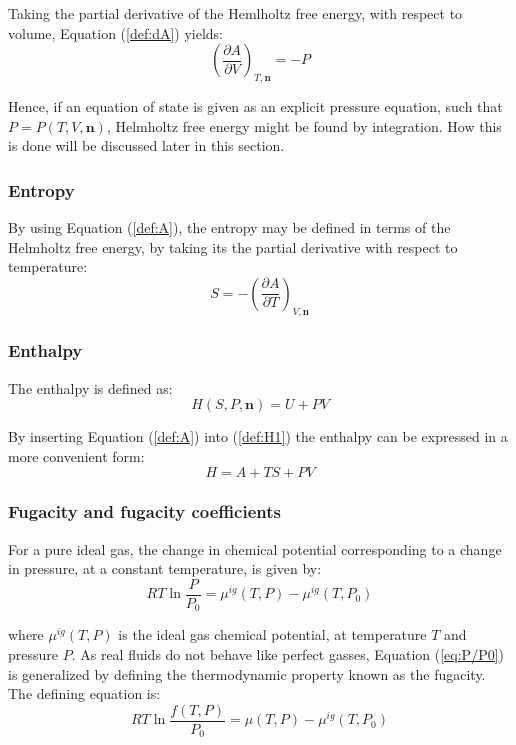\documentclass[internal,english]{sintefmemo2012}
\numberwithin{equation}{section}
\newcommand*{\pder}[2]{\left(\frac{\partial #1}{\partial #2}\right)}
\newcommand*{\reff}[1]{(\ref{#1})}
\begin{document}
Taking the partial derivative of the Hemlholtz free energy, with respect to volume, Equation \reff{def:dA} yields:
\begin{equation}
\label{def:-P}
\pder{A}{V}_{T,\textbf{n}} = -P
\end{equation}

Hence, if an equation of state is given as an explicit pressure equation, such that $P = P(T,V,\textbf{n})$, Helmholtz free energy might be found by integration. How this is done will be discussed later in this section.

\subsubsection*{Entropy}
By using Equation \reff{def:A}, the entropy may be defined in terms of the Helmholtz free energy, by taking its the partial derivative with respect to temperature:
\begin{equation}
\label{def:S}
S = - \pder{A}{T}_{V,\textbf{n}}
\end{equation}

\subsubsection*{Enthalpy}
The enthalpy is defined as:
\begin{equation}
\label{def:H1}
H(S,P,\textbf{n}) = U + PV
\end{equation}

By inserting Equation \reff{def:A} into \reff{def:H1} the enthalpy can be expressed in a more convenient form:
\begin{equation}
\label{def:H2}
H = A + TS + PV
\end{equation}

\subsubsection*{Fugacity and fugacity coefficients}
For a pure ideal gas, the change in chemical potential corresponding to a change in pressure, at a constant temperature, is given by:
\begin{equation}
\label{eq:P/P0}
RT \ln \frac{P}{P_0} = \mu^{ig} (T,P) - \mu^{ig} (T, P_0)
\end{equation}

where $\mu^{ig} (T,P)$ is the ideal gas chemical potential, at temperature $T$ and pressure $P$. As real fluids do not behave like perfect gasses, Equation \reff{eq:P/P0} is generalized by defining the thermodynamic property known as the fugacity. The defining equation is:
\begin{equation}
\label{eq:fugacity}
RT \ln \frac{f(T,P)}{P_0} = \mu (T,P) - \mu^{ig} (T, P_0)
\end{equation}
\end{document}
